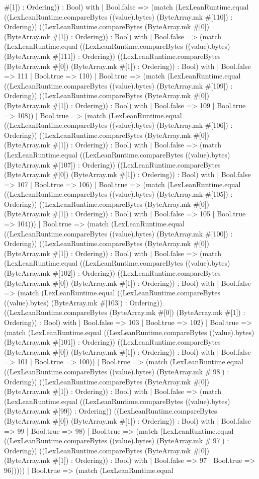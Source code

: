 \documentclass[11pt]{article}
\begin{document}
\#[1]) : Ordering)) : Bool) with | Bool.false => (match (LexLeanRuntime.equal ((LexLeanRuntime.compareBytes ((value).bytes) (ByteArray.mk \#[110]) : Ordering)) ((LexLeanRuntime.compareBytes (ByteArray.mk \#[0]) (ByteArray.mk \#[1]) : Ordering)) : Bool) with | Bool.false => (match (LexLeanRuntime.equal ((LexLeanRuntime.compareBytes ((value).bytes) (ByteArray.mk \#[111]) : Ordering)) ((LexLeanRuntime.compareBytes (ByteArray.mk \#[0]) (ByteArray.mk \#[1]) : Ordering)) : Bool) with | Bool.false => 111 | Bool.true => 110) | Bool.true => (match (LexLeanRuntime.equal ((LexLeanRuntime.compareBytes ((value).bytes) (ByteArray.mk \#[109]) : Ordering)) ((LexLeanRuntime.compareBytes (ByteArray.mk \#[0]) (ByteArray.mk \#[1]) : Ordering)) : Bool) with | Bool.false => 109 | Bool.true => 108)) | Bool.true => (match (LexLeanRuntime.equal ((LexLeanRuntime.compareBytes ((value).bytes) (ByteArray.mk \#[106]) : Ordering)) ((LexLeanRuntime.compareBytes (ByteArray.mk \#[0]) (ByteArray.mk \#[1]) : Ordering)) : Bool) with | Bool.false => (match (LexLeanRuntime.equal ((LexLeanRuntime.compareBytes ((value).bytes) (ByteArray.mk \#[107]) : Ordering)) ((LexLeanRuntime.compareBytes (ByteArray.mk \#[0]) (ByteArray.mk \#[1]) : Ordering)) : Bool) with | Bool.false => 107 | Bool.true => 106) | Bool.true => (match (LexLeanRuntime.equal ((LexLeanRuntime.compareBytes ((value).bytes) (ByteArray.mk \#[105]) : Ordering)) ((LexLeanRuntime.compareBytes (ByteArray.mk \#[0]) (ByteArray.mk \#[1]) : Ordering)) : Bool) with | Bool.false => 105 | Bool.true => 104))) | Bool.true => (match (LexLeanRuntime.equal ((LexLeanRuntime.compareBytes ((value).bytes) (ByteArray.mk \#[100]) : Ordering)) ((LexLeanRuntime.compareBytes (ByteArray.mk \#[0]) (ByteArray.mk \#[1]) : Ordering)) : Bool) with | Bool.false => (match (LexLeanRuntime.equal ((LexLeanRuntime.compareBytes ((value).bytes) (ByteArray.mk \#[102]) : Ordering)) ((LexLeanRuntime.compareBytes (ByteArray.mk \#[0]) (ByteArray.mk \#[1]) : Ordering)) : Bool) with | Bool.false => (match (LexLeanRuntime.equal ((LexLeanRuntime.compareBytes ((value).bytes) (ByteArray.mk \#[103]) : Ordering)) ((LexLeanRuntime.compareBytes (ByteArray.mk \#[0]) (ByteArray.mk \#[1]) : Ordering)) : Bool) with | Bool.false => 103 | Bool.true => 102) | Bool.true => (match (LexLeanRuntime.equal ((LexLeanRuntime.compareBytes ((value).bytes) (ByteArray.mk \#[101]) : Ordering)) ((LexLeanRuntime.compareBytes (ByteArray.mk \#[0]) (ByteArray.mk \#[1]) : Ordering)) : Bool) with | Bool.false => 101 | Bool.true => 100)) | Bool.true => (match (LexLeanRuntime.equal ((LexLeanRuntime.compareBytes ((value).bytes) (ByteArray.mk \#[98]) : Ordering)) ((LexLeanRuntime.compareBytes (ByteArray.mk \#[0]) (ByteArray.mk \#[1]) : Ordering)) : Bool) with | Bool.false => (match (LexLeanRuntime.equal ((LexLeanRuntime.compareBytes ((value).bytes) (ByteArray.mk \#[99]) : Ordering)) ((LexLeanRuntime.compareBytes (ByteArray.mk \#[0]) (ByteArray.mk \#[1]) : Ordering)) : Bool) with | Bool.false => 99 | Bool.true => 98) | Bool.true => (match (LexLeanRuntime.equal ((LexLeanRuntime.compareBytes ((value).bytes) (ByteArray.mk \#[97]) : Ordering)) ((LexLeanRuntime.compareBytes (ByteArray.mk \#[0]) (ByteArray.mk \#[1]) : Ordering)) : Bool) with | Bool.false => 97 | Bool.true => 96))))) | Bool.true => (match (LexLeanRuntime.equal 
\end{document}
